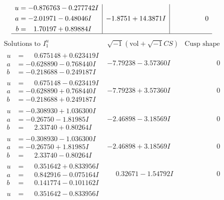 \documentclass[1p]{elsarticle_modified}
\theoremstyle{definition}
\newcommand{\I}{\sqrt{-1}}
\begin{document}
$$\begin{array}{c|c|c}
\begin{aligned}
u &= -0.876763 - 0.277742 I \\
a &= -2.01971 - 0.48046 I \\
b &= \phantom{-}1.70197 + 0.89884 I\end{aligned}
 & -1.8751 + 14.3871 I & \phantom{-0.000000 } 0\\
 \hline 
 \end{array}$$\newpage$$\begin{array}{c|c|c}  
\text{Solutions to }I^u_{1}& \I (\text{vol} + \sqrt{-1}CS) & \text{Cusp shape}\\
 \hline 
\begin{aligned}
u &= \phantom{-}0.675148 + 0.623419 I \\
a &= -0.628890 - 0.768440 I \\
b &= -0.218688 - 0.249187 I\end{aligned}
 & -7.79238 - 3.57360 I & \phantom{-0.000000 } 0 \\ \hline\begin{aligned}
u &= \phantom{-}0.675148 - 0.623419 I \\
a &= -0.628890 + 0.768440 I \\
b &= -0.218688 + 0.249187 I\end{aligned}
 & -7.79238 + 3.57360 I & \phantom{-0.000000 } 0 \\ \hline\begin{aligned}
u &= -0.308930 + 1.036300 I \\
a &= -0.26750 - 1.81985 I \\
b &= \phantom{-}2.33740 + 0.80264 I\end{aligned}
 & -2.46898 - 3.18569 I & \phantom{-0.000000 } 0 \\ \hline\begin{aligned}
u &= -0.308930 - 1.036300 I \\
a &= -0.26750 + 1.81985 I \\
b &= \phantom{-}2.33740 - 0.80264 I\end{aligned}
 & -2.46898 + 3.18569 I & \phantom{-0.000000 } 0 \\ \hline\begin{aligned}
u &= \phantom{-}0.351642 + 0.833956 I \\
a &= \phantom{-}0.842916 - 0.075164 I \\
b &= \phantom{-}0.141774 - 0.101162 I\end{aligned}
 & \phantom{-}0.32671 - 1.54792 I & \phantom{-0.000000 } 0 \\ \hline\begin{aligned}
u &= \phantom{-}0.351642 - 0.833956 I \\

\end{aligned}
\end{array}$$
\end{document}
